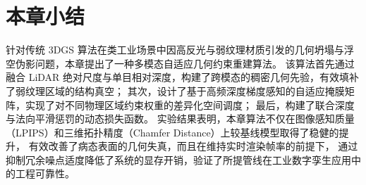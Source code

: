 
\section{本章小结}
\label{sec:chap3_summary}

针对传统 3DGS 算法在类工业场景中因高反光与弱纹理材质引发的几何坍塌与浮空伪影问题，本章提出了一种多模态自适应几何约束重建算法。
该算法首先通过融合 LiDAR 绝对尺度与单目相对深度，构建了跨模态的稠密几何先验，有效填补了弱纹理区域的结构真空；
其次，设计了基于高频深度梯度感知的自适应掩膜矩阵，实现了对不同物理区域约束权重的差异化空间调度；
最后，构建了联合深度与法向平滑惩罚的动态损失函数。
实验结果表明，本章算法不仅在图像感知质量（LPIPS）和三维拓扑精度（Chamfer Distance）上较基线模型取得了稳健的提升，
有效改善了病态表面的几何失真，而且在维持实时渲染帧率的前提下，
通过抑制冗余噪点适度降低了系统的显存开销，验证了所提管线在工业数字孪生应用中的工程可靠性。

